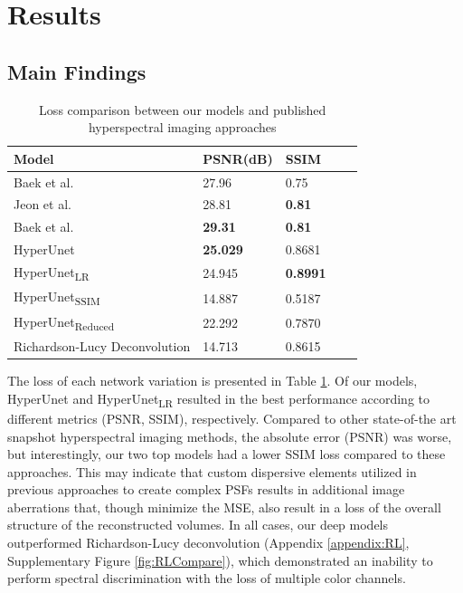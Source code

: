 \documentclass{article}
\begin{document}
\section{Results}
\label{sec:results}



\subsection{Main Findings}
\label{sec:main-findings}
\begin{table}
    \caption{Loss comparison between our models and published hyperspectral imaging approaches}
    \label{Results}
    \centering
    \begin{tabular}{lllll}
    \toprule
    Model & PSNR(dB) & SSIM \\
    \midrule
    Baek et al.\cite{baek2017compact} & 27.96 & 0.75 \\
    Jeon et al.\cite{jeon2019compact} & 28.81 & \textbf{0.81} \\
    Baek et al.\cite{baek2021single} & \textbf{29.31} & \textbf{0.81} \\
    \midrule
    HyperUnet & \textbf{25.029} & 0.8681 \\
    HyperUnet\textsubscript{LR} & 24.945 & \textbf{0.8991} \\
    HyperUnet\textsubscript{SSIM} & 14.887 & 0.5187 \\
    HyperUnet\textsubscript{Reduced} & 22.292 & 0.7870 \\
    Richardson-Lucy Deconvolution & 14.713 & 0.8615 \\
    \bottomrule
    \end{tabular}
\end{table}

The loss of each network variation is presented in Table \ref{Results}. Of our models, HyperUnet and HyperUnet\textsubscript{LR} resulted in the best performance according to different metrics (PSNR, SSIM), respectively. Compared to other state-of-the art snapshot hyperspectral imaging methods, the absolute error (PSNR) was worse, but interestingly, our two top models had a lower SSIM loss compared to these approaches. This may indicate that custom dispersive elements utilized in previous approaches to create complex PSFs results in additional image aberrations that, though minimize the MSE, also result in a loss of the overall structure of the reconstructed volumes. In all cases, our deep models outperformed Richardson-Lucy deconvolution (Appendix \ref{appendix:RL}, Supplementary Figure \ref{fig:RLCompare}), which demonstrated an inability to perform spectral discrimination with the loss of multiple color channels.
\end{document}
